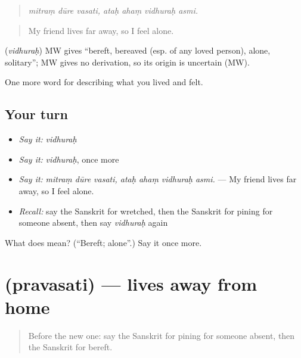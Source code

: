 \begin{quote}
\emph{mitraṃ dūre vasati, ataḥ ahaṃ vidhuraḥ asmi.}
\end{quote}

\begin{quote}
My friend lives far away, so I feel alone.
\end{quote}

\begin{cousinweb}
\textbf{} (\emph{vidhuraḥ}) MW gives \textquotedblleft{}bereft, bereaved (esp. of any loved person), alone, solitary\textquotedblright{}; MW gives no derivation, so its origin is uncertain (MW).
\end{cousinweb}

\begin{grammarlens}[title={What you've built}]
One more word for describing what you lived and felt.
\end{grammarlens}

\subsection*{Your turn}
\begin{itemize}
\raggedright
  \item \emph{Say it:} \emph{vidhuraḥ}
  \item \emph{Say it:} \emph{vidhuraḥ}, once more
  \item \emph{Say it:} \emph{mitraṃ dūre vasati, ataḥ ahaṃ vidhuraḥ asmi.} — My friend lives far away, so I feel alone.
  \item \emph{Recall:} say the Sanskrit for wretched, then the Sanskrit for pining for someone absent, then say \emph{vidhuraḥ} again
\end{itemize}

\begin{tcolorbox}[breakable,colback=teal!4,colframe=teal!35!black,title={Before you move on}]
What does  mean? (\textquotedblleft{}Bereft; alone\textquotedblright{}.) Say it once more.
\end{tcolorbox}
\section[\texorpdfstring{\sk{प्रवसति} (pravasati)}{प्रवसति (pravasati)}]{ (pravasati) — lives away from home}

\label{lesson:SA-C453-pravasati}



\begin{quote}
Before the new one: say the Sanskrit for pining for someone absent, then the Sanskrit for bereft.
\end{quote}

